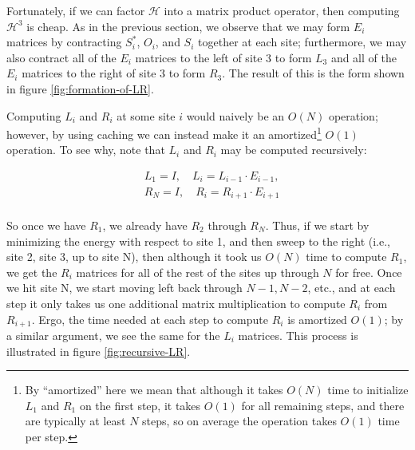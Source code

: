\documentclass[12pt]{amsbook}
\theoremstyle{plain}
\theoremstyle{definition}
\theoremstyle{remark}
\begin{document}
Fortunately, if we can factor $\mathscr{H}$ into a matrix product operator, then computing $\mathscr{H}^3$ is cheap.  As in the previous section, we observe that we may form $E_i$ matrices by contracting $S_i^*$, $O_i$, and $S_i$ together at each site;  furthermore, we may also contract all of the $E_i$ matrices to the left of site 3 to form $L_3$ and all of the $E_i$ matrices to the right of site 3 to form $R_3$.  The result of this is the form shown in figure \ref{fig:formation-of-LR}.

Computing $L_i$ and $R_i$ at some site $i$ would naively be an $O(N)$ operation; however, by using caching we can instead make it an amortized\footnote{By ``amortized'' here we mean that although it takes $O(N)$ time to initialize $L_1$ and $R_1$ on the first step, it takes $O(1)$ for all remaining steps, and there are typically at least $N$ steps, so on average the operation takes $O(1)$ time per step.} $O(1)$ operation.  To see why, note that $L_i$ and $R_i$ may be computed recursively:

$$
\begin{aligned}
&L_1 = I,\quad L_{i} = L_{i-1}\cdot E_{i-1},\\
&R_N = I,\quad R_i = R_{i+1}\cdot E_{i+1} \\
\end{aligned}
$$

So once we have $R_1$, we already have $R_2$ through $R_N$.  Thus, if we start by minimizing the energy with respect to site 1, and then sweep to the right (i.e., site 2, site 3, up to site N), then although it took us $O(N)$ time to compute $R_1$, we get the $R_i$ matrices for all of the rest of the sites up through $N$ for free.  Once we hit site N, we start moving left back through $N-1,N-2$, etc., and at each step it only takes us one additional matrix multiplication to compute $R_i$ from $R_{i+1}$.  Ergo, the time needed at each step to compute $R_i$ is amortized $O(1)$;  by a similar argument, we see the same for the $L_i$ matrices.  This process is illustrated in figure \ref{fig:recursive-LR}.
\end{document}
